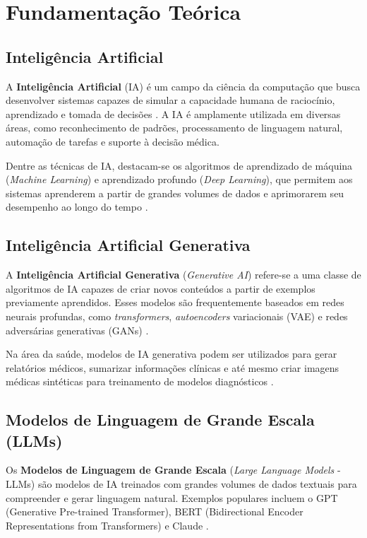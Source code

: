 \chapter{Fundamentação Teórica}

\section{Inteligência Artificial}

A \textbf{Inteligência Artificial} (IA) é um campo da ciência da computação que busca desenvolver sistemas capazes de simular a capacidade humana de raciocínio, aprendizado e tomada de decisões \cite{russell2016artificial}. A IA é amplamente utilizada em diversas áreas, como reconhecimento de padrões, processamento de linguagem natural, automação de tarefas e suporte à decisão médica.

Dentre as técnicas de IA, destacam-se os algoritmos de aprendizado de máquina (\textit{Machine Learning}) e aprendizado profundo (\textit{Deep Learning}), que permitem aos sistemas aprenderem a partir de grandes volumes de dados e aprimorarem seu desempenho ao longo do tempo \cite{goodfellow2016deep}.

\section{Inteligência Artificial Generativa}

A \textbf{Inteligência Artificial Generativa} (\textit{Generative AI}) refere-se a uma classe de algoritmos de IA capazes de criar novos conteúdos a partir de exemplos previamente aprendidos. Esses modelos são frequentemente baseados em redes neurais profundas, como \textit{transformers}, \textit{autoencoders} variacionais (VAE) e redes adversárias generativas (GANs) \cite{brown2020language}.

Na área da saúde, modelos de IA generativa podem ser utilizados para gerar relatórios médicos, sumarizar informações clínicas e até mesmo criar imagens médicas sintéticas para treinamento de modelos diagnósticos \cite{shen2021artificial}.

\section{Modelos de Linguagem de Grande Escala (LLMs)}

Os \textbf{Modelos de Linguagem de Grande Escala} (\textit{Large Language Models} - LLMs) são modelos de IA treinados com grandes volumes de dados textuais para compreender e gerar linguagem natural. Exemplos populares incluem o GPT (Generative Pre-trained Transformer), BERT (Bidirectional Encoder Representations from Transformers) e Claude \cite{devlin2018bert}.

